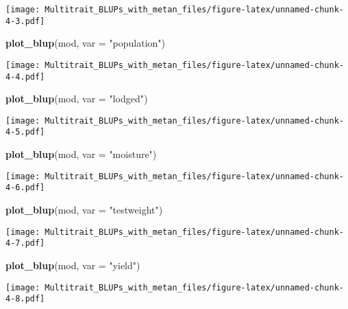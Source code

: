 \documentclass[
]{article}
\newenvironment{Shaded}{\begin{snugshade}}{\end{snugshade}}
\newcommand{\AttributeTok}[1]{\textcolor[rgb]{0.13,0.29,0.53}{#1}}
\newcommand{\FunctionTok}[1]{\textcolor[rgb]{0.13,0.29,0.53}{\textbf{#1}}}
\newcommand{\NormalTok}[1]{#1}
\newcommand{\StringTok}[1]{\textcolor[rgb]{0.31,0.60,0.02}{#1}}
\begin{document}
\texttt{[image: Multitrait\_BLUPs\_with\_metan\_files/figure-latex/unnamed-chunk-4-3.pdf]}

\begin{Shaded}
\begin{Highlighting}[]
\FunctionTok{plot\_blup}\NormalTok{(mod, }\AttributeTok{var =} \StringTok{"population"}\NormalTok{)}
\end{Highlighting}
\end{Shaded}

\texttt{[image: Multitrait\_BLUPs\_with\_metan\_files/figure-latex/unnamed-chunk-4-4.pdf]}

\begin{Shaded}
\begin{Highlighting}[]
\FunctionTok{plot\_blup}\NormalTok{(mod, }\AttributeTok{var =} \StringTok{"lodged"}\NormalTok{)}
\end{Highlighting}
\end{Shaded}

\texttt{[image: Multitrait\_BLUPs\_with\_metan\_files/figure-latex/unnamed-chunk-4-5.pdf]}

\begin{Shaded}
\begin{Highlighting}[]
\FunctionTok{plot\_blup}\NormalTok{(mod, }\AttributeTok{var =} \StringTok{"moisture"}\NormalTok{)}
\end{Highlighting}
\end{Shaded}

\texttt{[image: Multitrait\_BLUPs\_with\_metan\_files/figure-latex/unnamed-chunk-4-6.pdf]}

\begin{Shaded}
\begin{Highlighting}[]
\FunctionTok{plot\_blup}\NormalTok{(mod, }\AttributeTok{var =} \StringTok{"testweight"}\NormalTok{)}
\end{Highlighting}
\end{Shaded}

\texttt{[image: Multitrait\_BLUPs\_with\_metan\_files/figure-latex/unnamed-chunk-4-7.pdf]}

\begin{Shaded}
\begin{Highlighting}[]
\FunctionTok{plot\_blup}\NormalTok{(mod, }\AttributeTok{var =} \StringTok{"yield"}\NormalTok{)}
\end{Highlighting}
\end{Shaded}

\texttt{[image: Multitrait\_BLUPs\_with\_metan\_files/figure-latex/unnamed-chunk-4-8.pdf]}
\end{document}
